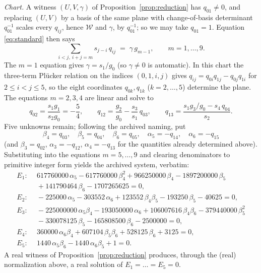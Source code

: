 \documentclass[10pt]{amsart}
\begin{document}
\emph{Chart.} A witness $(U,V,\gamma)$ of
Proposition~\ref{prop:reduction} has $q_{01}\neq0$, and replacing
$(U,V)$ by a basis of the same plane with change-of-basis determinant
$q_{01}^{-1}$ scales every $q_{ij}$, hence $\mathcal W$ and $\gamma$,
by $q_{01}^{-1}$; so we may take $q_{01}=1$. Equation
\eqref{eq:standard} then says
\[
\sum_{i<j,\ i+j=m}s_{j-i}\,q_{ij}\;=\;\gamma\,g_{m-1},
\qquad m=1,\dots,9 .
\]
The $m=1$ equation gives $\gamma=s_1/g_0$ (so $\gamma\neq0$ is
automatic). In this chart the three-term Pl\"ucker relation on the
indices $(0,1,i,j)$ gives $q_{ij}=q_{0i}q_{1j}-q_{0j}q_{1i}$ for
$2\le i<j\le5$, so the eight coordinates $q_{0k},q_{1k}$
($k=2,\dots,5$) determine the plane. The equations $m=2,3,4$ are
linear and solve to
\[
q_{02}=\frac{s_1g_1}{s_2g_0}=-\frac54,\qquad
q_{12}=\frac{g_2}{g_0}-\frac{s_3}{s_1}\,q_{03},\qquad
q_{13}=\frac{s_1g_3/g_0-s_4\,q_{04}}{s_2}.
\]
Five unknowns remain; following the archived naming, put
\[
\beta_4=q_{03},\quad \beta_5=q_{04},\quad \beta_6=q_{05},\quad
\alpha_5=-q_{14},\quad \alpha_6=-q_{15}
\]
(and $\beta_3=q_{02}$, $\alpha_3=-q_{12}$, $\alpha_4=-q_{13}$ for the
quantities already determined above). Substituting into the equations
$m=5,\dots,9$ and clearing denominators to primitive integer form
yields the archived system, verbatim:
{\small
\begin{align*}
E_1:&\ \ 617760000\,\alpha_5-617760000\,\beta_4^2+966250000\,\beta_4
-1897200000\,\beta_5\\
&\ \ +141790464\,\beta_6-1707265625=0,\\
E_2:&\ \ -225000\,\alpha_5-303552\,\alpha_6+123552\,\beta_4\beta_5
-193250\,\beta_5-40625=0,\\
E_3:&\ \ -225000000\,\alpha_5\beta_4-193050000\,\alpha_6
+106007616\,\beta_4\beta_6-379440000\,\beta_5^2\\
&\ \ -330078125\,\beta_5-165808500\,\beta_6-2500000=0,\\
E_4:&\ \ 360000\,\alpha_6\beta_4+607104\,\beta_5\beta_6
+528125\,\beta_6+3125=0,\\
E_5:&\ \ 1440\,\alpha_5\beta_6-1440\,\alpha_6\beta_5+1=0.
\end{align*}}%
A real witness of Proposition~\ref{prop:reduction} produces, through
the (real) normalization above, a real solution of
$E_1=\dots=E_5=0$.
\end{document}
